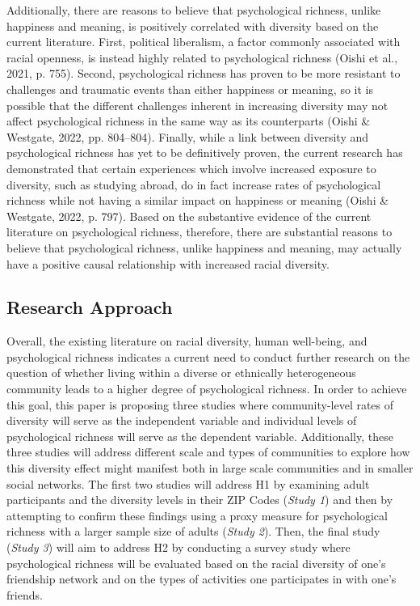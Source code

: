 \documentclass[
  man,floatsintext]{apa7}
\begin{document}
Additionally, there are reasons to believe that psychological richness, unlike happiness and meaning, is positively correlated with diversity based on the current literature. First, political liberalism, a factor commonly associated with racial openness, is instead highly related to psychological richness (Oishi et al., 2021, p. 755). Second, psychological richness has proven to be more resistant to challenges and traumatic events than either happiness or meaning, so it is possible that the different challenges inherent in increasing diversity may not affect psychological richness in the same way as its counterparts (Oishi \& Westgate, 2022, pp. 804--804). Finally, while a link between diversity and psychological richness has yet to be definitively proven, the current research has demonstrated that certain experiences which involve increased exposure to diversity, such as studying abroad, do in fact increase rates of psychological richness while not having a similar impact on happiness or meaning (Oishi \& Westgate, 2022, p. 797). Based on the substantive evidence of the current literature on psychological richness, therefore, there are substantial reasons to believe that psychological richness, unlike happiness and meaning, may actually have a positive causal relationship with increased racial diversity.

\hypertarget{research-approach}{%
\subsection{Research Approach}\label{research-approach}}

Overall, the existing literature on racial diversity, human well-being, and psychological richness indicates a current need to conduct further research on the question of whether living within a diverse or ethnically heterogeneous community leads to a higher degree of psychological richness. In order to achieve this goal, this paper is proposing three studies where community-level rates of diversity will serve as the independent variable and individual levels of psychological richness will serve as the dependent variable. Additionally, these three studies will address different scale and types of communities to explore how this diversity effect might manifest both in large scale communities and in smaller social networks. The first two studies will address H1 by examining adult participants and the diversity levels in their ZIP Codes (\emph{Study 1}) and then by attempting to confirm these findings using a proxy measure for psychological richness with a larger sample size of adults (\emph{Study 2}). Then, the final study (\emph{Study 3}) will aim to address H2 by conducting a survey study where psychological richness will be evaluated based on the racial diversity of one's friendship network and on the types of activities one participates in with one's friends.
\end{document}
